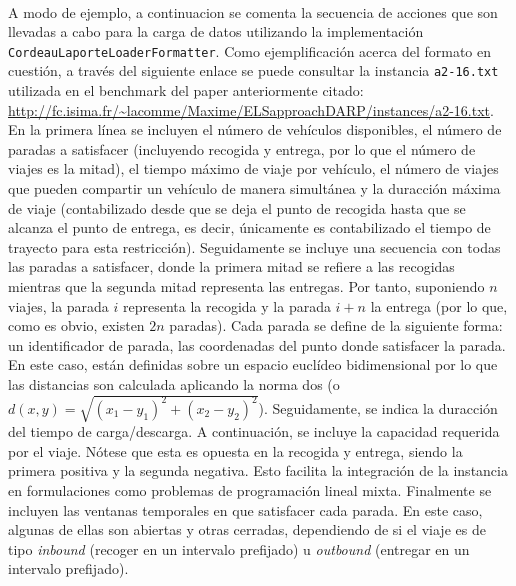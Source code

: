 \documentclass{subfiles}
\begin{document}
          \paragraph{}
          A modo de ejemplo, a continuacion se comenta la secuencia de acciones que son llevadas a cabo para la carga de datos utilizando la implementación \texttt{CordeauLaporteLoaderFormatter}. Como ejemplificación acerca del formato en cuestión, a través del siguiente enlace se puede consultar la instancia \texttt{a2-16.txt} utilizada en el benchmark del paper anteriormente citado: \url{http://fc.isima.fr/~lacomme/Maxime/ELSapproachDARP/instances/a2-16.txt}. En la primera línea se incluyen el número de vehículos disponibles, el número de paradas a satisfacer (incluyendo recogida y entrega, por lo que el número de viajes es la mitad), el tiempo máximo de viaje por vehículo, el número de viajes que pueden compartir un vehículo de manera simultánea y la duracción máxima de viaje (contabilizado desde que se deja el punto de recogida hasta que se alcanza el punto de entrega, es decir, únicamente es contabilizado el tiempo de trayecto para esta restricción). Seguidamente se incluye una secuencia con todas las paradas a satisfacer, donde la primera mitad se refiere a las recogidas mientras que la segunda mitad representa las entregas. Por tanto, suponiendo $n$ viajes, la parada $i$ representa la recogida y la parada $i + n$ la entrega (por lo que, como es obvio, existen $2n$ paradas). Cada parada se define de la siguiente forma: un identificador de parada, las coordenadas del punto donde satisfacer la parada. En este caso, están definidas sobre un espacio euclídeo bidimensional por lo que las distancias son calculada aplicando la norma dos (o $d(x, y) = \sqrt{(x_{1} - y_{1}) ^ 2 + (x_{2} - y_{2}) ^ 2}$). Seguidamente, se indica la duracción del tiempo de carga/descarga. A continuación, se incluye la capacidad requerida por el viaje. Nótese que esta es opuesta en la recogida y entrega, siendo la primera positiva y la segunda negativa. Esto facilita la integración de la instancia en formulaciones como problemas de programación lineal mixta. Finalmente se incluyen las ventanas temporales en que satisfacer cada parada. En este caso, algunas de ellas son abiertas y otras cerradas, dependiendo de si el viaje es de tipo \emph{inbound} (recoger en un intervalo prefijado) u \emph{outbound} (entregar en un intervalo prefijado).
\end{document}
